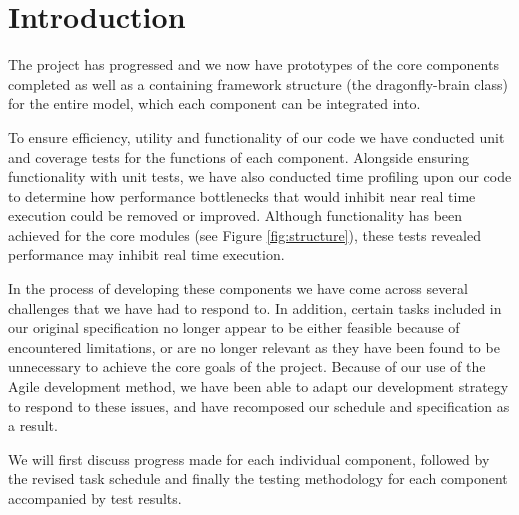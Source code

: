\section{Introduction}
The project has progressed and we now have prototypes of the core components completed as well as a containing framework structure (the dragonfly-brain class) for the entire model, which each component can be integrated into.

To ensure efficiency, utility and functionality of our code we have conducted unit and coverage tests for the functions of each component. Alongside ensuring functionality with unit tests, we have also conducted time profiling upon our code to determine how performance bottlenecks that would inhibit near real time execution could be removed or improved. Although functionality has been achieved for the core modules (see Figure \ref{fig:structure}), these tests revealed performance may inhibit real time execution.

In the process of developing these components we have come across several challenges that we have had to respond to. In addition, certain tasks included in our original specification no longer appear to be either feasible because of encountered limitations, or are no longer relevant as they have been found to be unnecessary to achieve the core goals of the project. Because of our use of the Agile development method, we have been able to adapt our development strategy to respond to these issues, and have recomposed our schedule and specification as a result.

We will first discuss progress made for each individual component, followed by the revised task schedule and finally the testing methodology for each component accompanied by test results.
